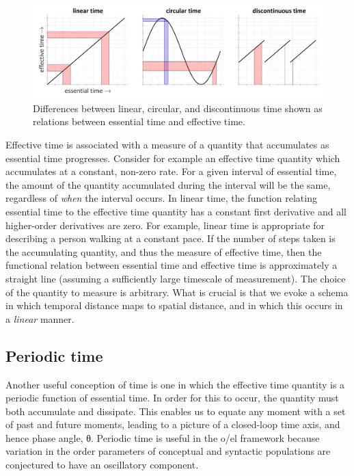   
\begin{figure}
\includegraphics[width=\textwidth]{figures/Tilsen-img45.png}
\caption{Differences between linear, circular, and discontinuous time shown as relations between essential time and effective time.}
\label{fig:3:17}
\end{figure}
 

  Effective time is associated with a measure of a quantity that accumulates as essential time progresses. Consider for example an effective time quantity which accumulates at a constant, non-zero rate. For a given interval of essential time, the amount of the quantity accumulated during the interval will be the same, regardless of \textit{when} the interval occurs. In linear time, the function relating essential time to the effective time quantity has a constant first derivative and all higher-order derivatives are zero. For example, linear time is appropriate for describing a person walking at a constant pace. If the number of steps taken is the accumulating quantity, and thus the measure of effective time, then the functional relation between essential time and effective time is approximately a straight line (assuming a sufficiently large timescale of measurement). The choice of the quantity to measure is arbitrary. What is crucial is that we evoke a schema in which temporal distance maps to spatial distance, and in which this occurs in a \textit{linear} manner.

\subsection{Periodic time}

Another useful conception of time is one in which the effective time quantity is a periodic function of essential time. In order for this to occur, the quantity must both accumulate and dissipate. This enables us to equate any moment with a set of past and future moments, leading to a picture of a closed-loop time axis, and hence phase angle, θ. Periodic time is useful in the o/el framework because variation in the order parameters of conceptual and syntactic populations are conjectured to have an oscillatory component.

